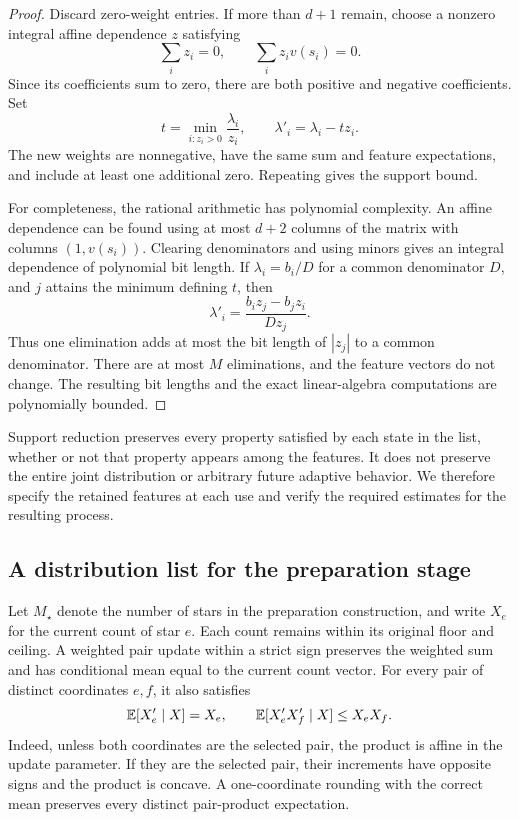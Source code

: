 \begin{proof}
Discard zero-weight entries. If more than \(d+1\) remain, choose a
nonzero integral affine dependence \(z\) satisfying
\[
 \sum_i z_i=0,
 \qquad
 \sum_i z_i v(s_i)=0.
\]
Since its coefficients sum to zero, there are both positive and negative
coefficients. Set
\[
 t=\min_{i:z_i>0}\frac{\lambda_i}{z_i},
 \qquad
 \lambda'_i=\lambda_i-tz_i.
\]
The new weights are nonnegative, have the same sum and feature
expectations, and include at least one additional zero. Repeating gives
the support bound.

For completeness, the rational arithmetic has polynomial complexity.
An affine dependence can be found using at most \(d+2\) columns of the
matrix with columns \((1,v(s_i))\). Clearing denominators and using
minors gives an integral dependence of polynomial bit length. If
\(\lambda_i=b_i/D\) for a common denominator \(D\), and \(j\) attains
the minimum defining \(t\), then
\begin{equation}
 \lambda'_i=
 \frac{b_i z_j-b_jz_i}{Dz_j}.
 \label{eq:compression-denominator}
\end{equation}
Thus one elimination adds at most the bit length of \(|z_j|\) to a
common denominator. There are at most \(M\) eliminations, and the
feature vectors do not change. The resulting bit lengths and the exact
linear-algebra computations are polynomially bounded.
\end{proof}

Support reduction preserves every property satisfied by each state in
the list, whether or not that property appears among the features. It
does not preserve the entire joint distribution or arbitrary future
adaptive behavior. We therefore specify the retained features at each
use and verify the required estimates for the resulting process.

\subsection{A distribution list for the preparation stage}

Let \(M_\star\) denote the number of stars in the preparation
construction, and write \(X_e\) for the current count of star \(e\).
Each count remains within its original floor and ceiling. A weighted
pair update within a strict sign preserves the weighted sum and has
conditional mean equal to the current count vector. For every pair of
distinct coordinates \(e,f\), it also satisfies
\begin{equation}
 \mathbb E[X'_e\mid X]=X_e,
 \qquad
 \mathbb E[X'_eX'_f\mid X]\le X_eX_f.
 \label{eq:star-local-moments}
\end{equation}
Indeed, unless both coordinates are the selected pair, the product is
affine in the update parameter. If they are the selected pair, their
increments have opposite signs and the product is concave. A
one-coordinate rounding with the correct mean preserves every distinct
pair-product expectation.

